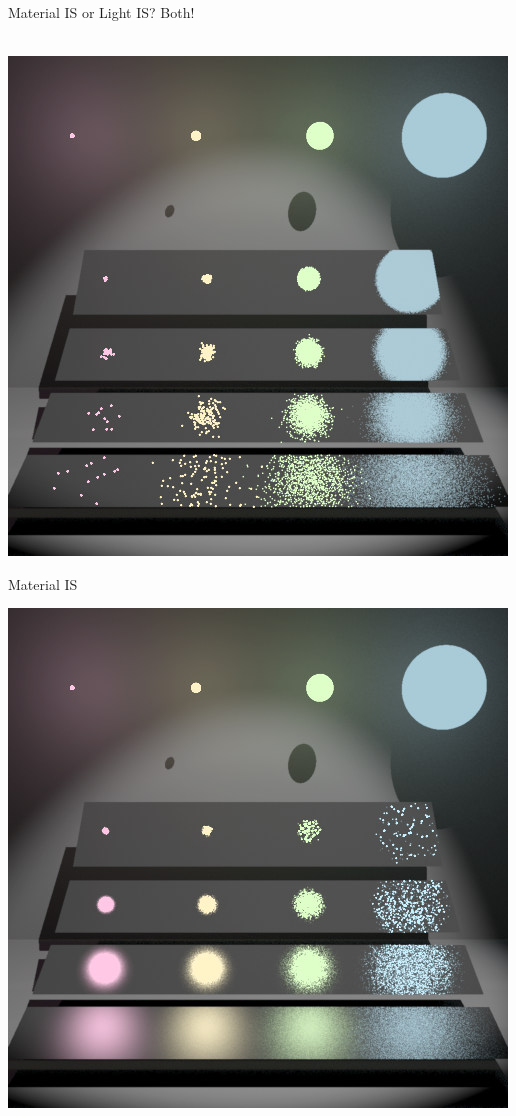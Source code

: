 \documentclass[utf8,stillsansserifmath,fleqn,t]{beamer}
\begin{document}
\begin{frame}
\frametitle{\insertsection}
Material IS or Light IS? Both!\\~\\
\begin{minipage}[t]{.33\textwidth}
\includegraphics[width=\textwidth]{./fig/veach-mis-1.png}
\centerline{Material IS}
\end{minipage}\hfill
\begin{minipage}[t]{.33\textwidth}
\includegraphics[width=\textwidth]{./fig/veach-mis-2.png}

\end{minipage}
\end{frame}
\end{document}
